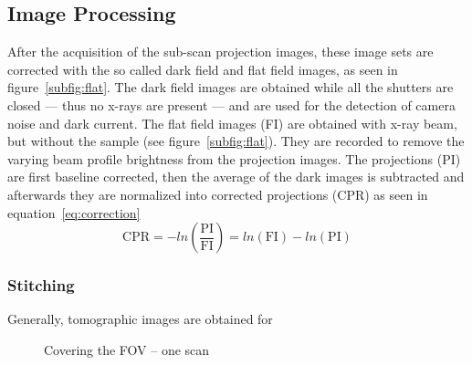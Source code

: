 \subsection{Image Processing}
\label{subsec:image processing}
After the acquisition of the sub-scan projection images, these image sets are corrected with the so called dark field and flat field images, as seen in figure~\ref{subfig:flat}. The dark field images are obtained while all the shutters are closed --- thus no x-rays are present --- and are used for the detection of camera noise and dark current. The flat field images (FI) are obtained with x-ray beam, but without the sample (see figure~\ref{subfig:flat}). They are recorded to remove the varying beam profile brightness from the projection images. The projections (PI) are first baseline corrected, then the average of the dark images is subtracted and afterwards they are normalized into corrected projections (CPR) as seen in equation~\ref{eq:correction}
\begin{equation}
\text{CPR}=-ln\left(\frac{\text{PI}}{\text{FI}}\right)=ln(\text{FI})-ln(\text{PI})
\label{eq:correction}
\end{equation}

\subsubsection{Stitching}
Generally, tomographic images are obtained for 

\begin{figure}[tb]
	\centering
	\caption{Covering the FOV -- one scan}
	\label{fig:covering}
\end{figure}

